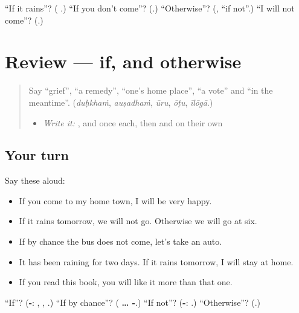 \begin{tcolorbox}[breakable,colback=teal!4,colframe=teal!35!black,title={Before you move on}]
\textquotedblleft{}If it rains\textquotedblright{}? (\textbf{ }.) \textquotedblleft{}If you don't come\textquotedblright{}? (\textbf{}.) \textquotedblleft{}Otherwise\textquotedblright{}? (\textbf{}, \textquotedblleft{}if not\textquotedblright{}.) \textquotedblleft{}I will not come\textquotedblright{}? (\textbf{}.)
\end{tcolorbox}
\section[(review)]{Review — if, and otherwise}

\label{lesson:TE-R324-if-and-otherwise}



\begin{quote}
Say \textquotedblleft{}grief\textquotedblright{}, \textquotedblleft{}a remedy\textquotedblright{}, \textquotedblleft{}one's home place\textquotedblright{}, \textquotedblleft{}a vote\textquotedblright{} and \textquotedblleft{}in the meantime\textquotedblright{}. (\emph{duḥkhaṁ}, \emph{auṣadhaṁ}, \emph{ūru}, \emph{ōṭu}, \emph{īlōgā}.)

\begin{itemize}
\raggedright
  \item \emph{Write it:} \textbf{}, \textbf{} and \textbf{} once each, then \textbf{} and \textbf{} on their own
\end{itemize}
\end{quote}

\subsection*{Your turn}
Say these aloud:

\begin{itemize}
\raggedright
  \item If you come to my home town, I will be very happy.
  \item If it rains tomorrow, we will not go. Otherwise we will go at six.
  \item If by chance the bus does not come, let's take an auto.
  \item It has been raining for two days. If it rains tomorrow, I will stay at home.
  \item If you read this book, you will like it more than that one.
\end{itemize}

\begin{tcolorbox}[breakable,colback=teal!4,colframe=teal!35!black,title={Before you move on}]
\textquotedblleft{}If\textquotedblright{}? (\textbf{-}: \textbf{}, \textbf{}, \textbf{}.) \textquotedblleft{}If by chance\textquotedblright{}? (\textbf{ … -}.) \textquotedblleft{}If not\textquotedblright{}? (\textbf{-}: \textbf{}.) \textquotedblleft{}Otherwise\textquotedblright{}? (\textbf{}.)
\end{tcolorbox}
